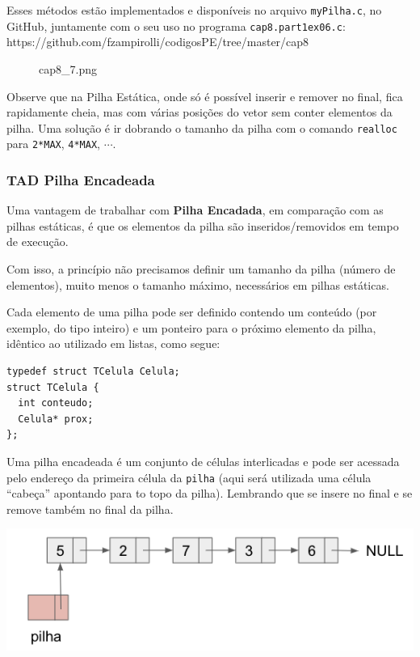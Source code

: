 \documentclass[12pt,a4paper]{article}
\begin{document}
Esses métodos estão implementados e disponíveis no arquivo
\texttt{myPilha.c}, no GitHub, juntamente com o seu uso no programa
\texttt{cap8.part1ex06.c}:
https://github.com/fzampirolli/codigosPE/tree/master/cap8

    \begin{figure}
\centering
\caption{cap8\_7.png}
\end{figure}

    Observe que na Pilha Estática, onde só é possível inserir e remover no
final, fica rapidamente cheia, mas com várias posições do vetor sem
conter elementos da pilha. Uma solução é ir dobrando o tamanho da pilha
com o comando \texttt{realloc} para \texttt{2*MAX}, \texttt{4*MAX},
\(\cdots\).

    \hypertarget{tad-pilha-encadeada}{%
\subsubsection{TAD Pilha Encadeada}\label{tad-pilha-encadeada}}

    Uma vantagem de trabalhar com \textbf{Pilha Encadada}, em comparação com
as pilhas estáticas, é que os elementos da pilha são inseridos/removidos
em tempo de execução.

Com isso, a princípio não precisamos definir um tamanho da pilha (número
de elementos), muito menos o tamanho máximo, necessários em pilhas
estáticas.

Cada elemento de uma pilha pode ser definido contendo um conteúdo (por
exemplo, do tipo inteiro) e um ponteiro para o próximo elemento da
pilha, idêntico ao utilizado em listas, como segue:

\begin{verbatim}
typedef struct TCelula Celula;
struct TCelula {
  int conteudo;
  Celula* prox;
};
\end{verbatim}

Uma pilha encadeada é um conjunto de células interlicadas e pode ser
acessada pelo endereço da primeira célula da \texttt{pilha} (aqui será
utilizada uma célula ``cabeça'' apontando para to topo da pilha).
Lembrando que se insere no final e se remove também no final da pilha.

\includegraphics{"figs/cap8_8.png"}
\end{document}
